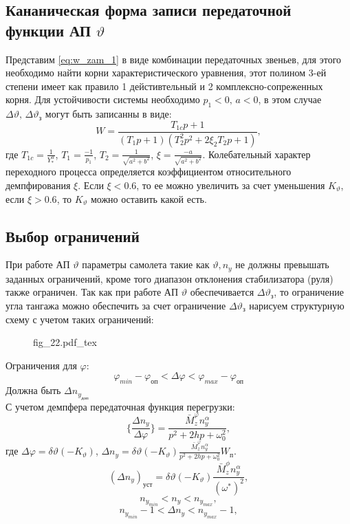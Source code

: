 \documentclass{article}
\begin{document}
\subsection{Кананическая форма записи передаточной функции АП \texorpdfstring{$\vartheta$}{Lg}}
Представим \ref{eq:w_zam_1} в виде комбинации передаточных звеньев, для этого необходимо найти корни характеристического уравнения, этот полином 3-ей степени имеет как правило 1 дейстивтельный и 2 комплексно-сопреженных корня. Для устойчивости системы необходимо $p_1 < 0, \, a<0$, в этом случае $\Delta \vartheta, \, \Delta \vartheta_\text{з}$ могут быть записанны в виде:
\[
	W = \frac{T_{1c} p + 1}{(T_{1}p + 1)(T_2^2 p^2 + 2 \xi_2 T_2 p + 1)}, 
\]
где $T_{1c} = \frac{1}{Y_*^\alpha}$, $T_1 = \frac{-1}{p_1}$, $T_2 = \frac{1}{\sqrt{a^2 + b^2}}$, $\xi = \frac{-a}{\sqrt{a^2 + b^2}}$.
Колебательный характер переходного процесса определяется коэффициентом относительного демпфирования $\xi$. Если $\xi < 0.6$, то ее можно увеличить за счет уменьшения $K_\vartheta$, если $\xi > 0.6$, то $K_\vartheta$ можно оставить какой есть.
\subsection{Выбор ограничений}
При работе АП $\vartheta$ параметры самолета такие как $\vartheta, n_y$ не должны превышать заданных ограничений, кроме того диапазон отклонения стабилизатора (руля) также ограничен. Так как при работе АП $\vartheta$ обеспечивается $\Delta \vartheta_\text{з}$, то ограничение угла тангажа можно обеспечить за счет ограничение $\Delta \vartheta_\text{з}$ нарисуем структурную схему с учетом таких ограничений:

\begin{figure}[H]
	\centering
	{fig_22.pdf_tex}
\end{figure}

Ограничения для $\varphi$:
\[ \varphi_{min} - \varphi_\text{оп} < \Delta \varphi < \varphi_{max} - \varphi_\text{оп}\]
Должна быть $\Delta n_{y_\text{доп}}$\\
С учетом демпфера передаточная функция перегрузки: 
\[
	\{\frac{\Delta n_y}{\Delta \varphi}\} = \frac{\bar{M}_z^\varphi n_y^\alpha}{p^2 + 2hp + \omega_0^2},
\]
где $\Delta \varphi = \delta \vartheta (-K_\vartheta)$, $\Delta n_y = \delta \vartheta (-K_\vartheta ) \frac{\bar{M}_z^\varphi n_y^\alpha}{p^2 + 2hp + \omega_0^2}W_\text{п}$.
\[
	(\Delta n_y)_\text{уст} = \delta \vartheta (- K_\vartheta)\frac{\bar{M}_z^\phi n_y^\alpha}{(\omega^*)^2},
\]
\[
	n_{{y}_{min}} < n_y < n_{{y}_{max}},
\]
\[
	n_{{y}_{min}} - 1< \Delta n_y < n_{{y}_{max}} - 1,
\]
\end{document}
